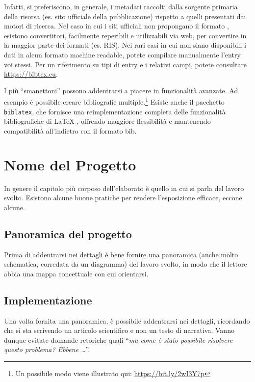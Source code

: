 \documentclass[12pt]{report}
\begin{document}
    Infatti, si preferiscono, in generale, i metadati raccolti dalla sorgente primaria della risorsa (es. sito ufficiale della pubblicazione) rispetto a quelli presentati dai motori di ricerca. Nel caso in cui i siti ufficiali non propongano il formato , esistono convertitori, facilmente reperibili e utilizzabili via web, per convertire in  la maggior parte dei formati (es. RIS). Nei rari casi in cui non siano disponibili i dati in alcun formato machine readable, potete compilare manualmente l'entry  voi stessi. Per un riferimento su tipi di entry e i relativi campi, potete consultare \url{https://bibtex.eu}.

    I pi\`u ``smanettoni'' possono addentrarsi a piacere in funzionalit\`a avanzate. Ad esempio \`e possibile creare bibliografie multiple.\footnote{Un possibile modo viene illustrato qui: \url{https://bit.ly/2wI3Y7p}}
    Esiste anche il pacchetto \texttt{biblatex}, che fornisce una reimplementazione completa delle funzionalit\`a bibliografiche di \LaTeX-, offrendo maggiore flessibilit\`a e mantenendo compatibilit\`a all'indietro con il formato bib.





%
%

    \chapter{Nome del Progetto}
    \label{cap4}

    In genere il capitolo più corposo dell'elaborato è quello in cui si parla del lavoro svolto. Esistono alcune buone pratiche per rendere l'esposizione efficace, eccone alcune.

    \section{Panoramica del progetto}

    Prima di addentrarsi nei dettagli è bene fornire una panoramica (anche molto schematica, corredata da un diagramma) del lavoro svolto, in modo che il lettore abbia una mappa concettuale con cui orientarsi.

    \section{Implementazione}

    Una volta fornita una panoramica, è possibile addentrarsi nei dettagli, ricordando che si sta scrivendo un articolo scientifico e non un testo di narrativa. Vanno dunque evitate domande retoriche quali ``\textit{ma come è stato possibile risolvere questo problema? Ebbene \ldots}''.
\end{document}
